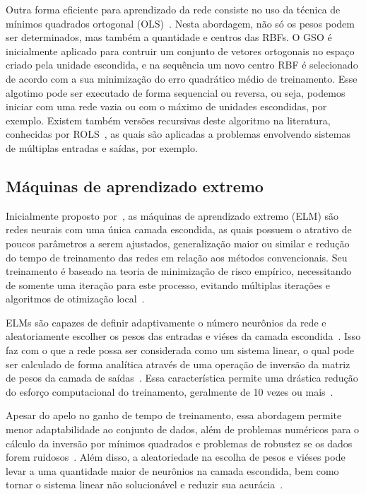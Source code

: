 \documentclass[conference]{IEEEtran}
\begin{document}
	Outra forma eficiente para aprendizado da rede consiste no uso da técnica de mínimos quadrados ortogonal (OLS)~\cite{chen1991orthogonal, chen1992orthogonal, chen1995fast, hong1997givens}. Nesta abordagem, não só os pesos podem ser determinados, mas também a quantidade e centros das RBFs. O GSO é inicialmente aplicado para contruir um conjunto de vetores ortogonais no espaço criado pela unidade escondida, e na sequência um novo centro RBF é selecionado de acordo com a sua minimização do erro quadrático médio de treinamento. Esse algotimo pode ser executado de forma sequencial ou reversa, ou seja, podemos iniciar com uma rede vazia ou com o máximo de unidades escondidas, por exemplo. Existem também versões recursivas deste algoritmo na literatura, conhecidas por ROLS~\cite{yu1997recursive}, as quais são aplicadas a problemas envolvendo sistemas de múltiplas entradas e saídas, por exemplo.
	

	\subsection{Máquinas de aprendizado extremo}
	Inicialmente proposto por~\cite{huang2004extreme}, as máquinas de aprendizado extremo (ELM) são redes neurais com uma única camada escondida, as quais possuem o atrativo de poucos parâmetros a serem ajustados, generalização maior ou similar e redução do tempo de treinamento das redes em relação aos métodos convencionais. Seu treinamento é baseado na teoria de minimização de risco empírico, necessitando de somente uma iteração para este processo, evitando múltiplas iterações e algoritmos de otimização local~\cite{ding2015extreme}. 
	
	ELMs são capazes de definir adaptivamente o número neurônios da rede e aleatoriamente escolher os pesos das entradas e viéses da camada escondida~\cite{huang2006extreme}. Isso faz com o que a rede possa ser considerada como um sistema linear, o qual pode ser calculado de forma analítica através de uma operação de inversão da matriz de pesos da camada de saídas~\cite{huang2006extreme}. Essa característica permite uma drástica redução do esforço computacional do treinamento, geralmente de 10 vezes ou mais~\cite{deng2010research}. 
	
	Apesar do apelo no ganho de tempo de treinamento, essa abordagem permite menor adaptabilidade ao conjunto de dados, além de problemas numéricos para o cálculo da inversão por mínimos quadrados e problemas de robustez se os dados forem ruidosos~\cite{ding2015extreme}. Além disso, a aleatoriedade na  escolha de pesos e viéses pode levar a uma quantidade maior de neurônios na camada escondida, bem como tornar o sistema linear não solucionável e reduzir sua acurácia~\cite{wang2011study}.
	
\end{document}
